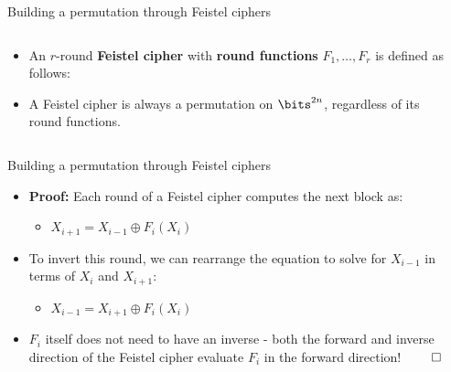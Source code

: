 \documentclass[aspectratio=169, lualatex, handout]{beamer}
\begin{document}
\begin{frame}{Building a permutation through Feistel ciphers}
	\begin{columns}[c]
		\begin{column}{0.5\textwidth}
			\begin{itemize}[<+->]
				\item An $r$-round \textbf{Feistel cipher} with \textbf{round functions} $F_1,\ldots,F_r$ is defined as follows:\\
				      \begin{center}
				      \end{center}
				\item A Feistel cipher is always a permutation on $\bits^{2n}$, regardless of its round functions.
			\end{itemize}
		\end{column}
		\begin{column}{0.5\textwidth}
		\end{column}
	\end{columns}
\end{frame}

\begin{frame}{Building a permutation through Feistel ciphers}
	\begin{itemize}[<+->]
		\item \textbf{Proof:} Each round of a Feistel cipher computes the next block as:
		      \begin{itemize}[<+->]
			      \item $X_{i+1} = X_{i-1} \oplus F_{i}(X_{i})$
		      \end{itemize}
		\item To invert this round, we can rearrange the equation to solve for $X_{i-1}$ in terms of $X_{i}$ and $X_{i+1}$:
		      \begin{itemize}[<+->]
			      \item $X_{i-1} = X_{i+1} \oplus F_{i}(X_{i})$
		      \end{itemize}
		\item $F_i$ itself does not need to have an inverse - both the forward and inverse direction of the Feistel cipher evaluate $F_i$ in the forward direction! $\qed$
	\end{itemize}
\end{frame}
\end{document}
